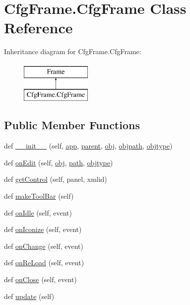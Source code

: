 \hypertarget{classCfgFrame_1_1CfgFrame}{}\section{Cfg\+Frame.\+Cfg\+Frame Class Reference}
\label{classCfgFrame_1_1CfgFrame}
Inheritance diagram for Cfg\+Frame.\+Cfg\+Frame\+:\begin{figure}[H]
\begin{center}
\leavevmode
\includegraphics[height=2.000000cm]{classCfgFrame_1_1CfgFrame}
\end{center}
\end{figure}
\subsection*{Public Member Functions}
\begin{DoxyCompactItemize}
\item 
def \hyperlink{classCfgFrame_1_1CfgFrame_aa0881a28d515572385ac1561e63c5c66}{\+\_\+\+\_\+init\+\_\+\+\_\+} (self, \hyperlink{classCfgFrame_1_1CfgFrame_a16ddc4cc2acb83418a38eb3585ee0cf1}{app}, \hyperlink{classCfgFrame_1_1CfgFrame_aa2bef7a3e39a5594300fa8e937188cb6}{parent}, \hyperlink{classCfgFrame_1_1CfgFrame_a5035fd7edabdfbf2919ba8ae47b2cdf0}{obj}, \hyperlink{classCfgFrame_1_1CfgFrame_a0a33bcbfbac5e80e5c4d0069ed9d6c91}{objpath}, \hyperlink{classCfgFrame_1_1CfgFrame_a224427c3ba9e154dbdf952a8150cd254}{objtype})
\item 
def \hyperlink{classCfgFrame_1_1CfgFrame_acf46c57cf539a9e2ed98333580508835}{on\+Edit} (self, \hyperlink{classCfgFrame_1_1CfgFrame_a5035fd7edabdfbf2919ba8ae47b2cdf0}{obj}, \hyperlink{classCfgFrame_1_1CfgFrame_ae52aeb447fb28afe9351980b60bdd63b}{path}, \hyperlink{classCfgFrame_1_1CfgFrame_a224427c3ba9e154dbdf952a8150cd254}{objtype})
\item 
def \hyperlink{classCfgFrame_1_1CfgFrame_acbf6f510d17cf39882c4968de0629170}{get\+Control} (self, panel, xmlid)
\item 
def \hyperlink{classCfgFrame_1_1CfgFrame_ae2d9110db5110fd1ca709e62e252a272}{make\+Tool\+Bar} (self)
\item 
def \hyperlink{classCfgFrame_1_1CfgFrame_ad63704259ed900af6c1d0844c07aaea9}{on\+Idle} (self, event)
\item 
def \hyperlink{classCfgFrame_1_1CfgFrame_adc334ba0611bcc77be88db2d9956e784}{on\+Iconize} (self, event)
\item 
def \hyperlink{classCfgFrame_1_1CfgFrame_afa122f42de17c4e6685cec02376c11af}{on\+Change} (self, event)
\item 
def \hyperlink{classCfgFrame_1_1CfgFrame_a3aaf73db16dddc96228e7d0fe3900d3a}{on\+Re\+Load} (self, event)
\item 
def \hyperlink{classCfgFrame_1_1CfgFrame_aab5f2e7597bccc345b1c953cac83275d}{on\+Close} (self, event)
\item 
def \hyperlink{classCfgFrame_1_1CfgFrame_af1662dd55c7c073239f392f7927791d3}{update} (self)
\end{DoxyCompactItemize}

